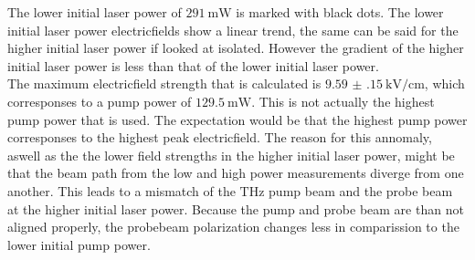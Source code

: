 The lower initial laser power of $\SI{291}{\milli\W}$ is marked with black dots.
The lower initial laser power electricfields show a linear trend, the same can be said for the higher initial laser power if looked at isolated.
However the gradient of the higher initial laser power is less than that of the lower initial laser power.
\\
The maximum electricfield strength that is calculated is $\SI{9.59(15)}{\kilo\V\per\centi\meter}$, which corresponses to a pump power of $\SI{129.5}{\milli\W}$.
This is not actually the highest pump power that is used.
The expectation would be that the highest pump power corresponses to the highest peak electricfield.
The reason for this annomaly, aswell as the the lower field strengths in the higher initial laser power, might be that the beam path from the low and high power measurements diverge from one another.
This leads to a mismatch of the $\si{\tera\hertz}$ pump beam and the probe beam at the higher initial laser power.
Because the pump and probe beam are than not aligned properly, the probebeam polarization changes less in comparission to the lower initial pump power.

\FloatBarrier
